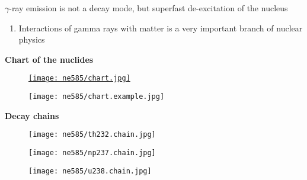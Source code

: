 \documentclass[aspectratio=1610,pdftex,dvipsnames,compress,xcolor={dvipsnames}]{beamer}
\begin{document}
\begin{frame}{$\gamma$-ray emission is not a decay mode, but superfast de-excitation of the nucleus}
    \begin{enumerate}[series=outerlist,topsep=0pt,itemsep=21pt,leftmargin=*,label=(\arabic*)]
        \item[]Interactions of gamma rays with matter is a very important branch of nuclear physics
    \end{enumerate}
\end{frame}


\begin{frame}[plain]{}
    \centering\LARGE\textbf{Chart of the nuclides}
\end{frame}


\addtocounter{framenumber}{-1}
\begin{frame}{}
    \begin{figure}
        \centering
        \href{https://www.nndc.bnl.gov/chart/}{\texttt{[image: ne585/chart.jpg]}}
    \end{figure}
\end{frame}


\begin{frame}{}
    \begin{figure}
        \centering
        \texttt{[image: ne585/chart.example.jpg]}
    \end{figure}
\end{frame}


\begin{frame}[plain]{}
    \centering\LARGE\textbf{Decay chains}
\end{frame}


\addtocounter{framenumber}{-1}
\begin{frame}{}
    \begin{figure}
        \centering
        \texttt{[image: ne585/th232.chain.jpg]}
    \end{figure}
\end{frame}


\begin{frame}{}
    \begin{figure}
        \centering
        \texttt{[image: ne585/np237.chain.jpg]}
    \end{figure}
\end{frame}


\begin{frame}{}
    \begin{figure}
        \centering
        \texttt{[image: ne585/u238.chain.jpg]}
    \end{figure}
\end{frame}
\end{document}
